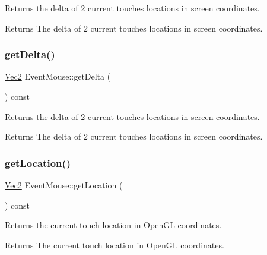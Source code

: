 Returns the delta of 2 current touches locations in screen coordinates.

\begin{DoxyReturn}{Returns}
The delta of 2 current touches locations in screen coordinates. 
\end{DoxyReturn}
\mbox{\label{classEventMouse_abda7f9a6569febd5041d4efd7fca35e6}} 
\subsubsection{\texorpdfstring{get\+Delta()}{getDelta()}\hspace{0.1cm}{\footnotesize\ttfamily [2/2]}}
{\footnotesize\ttfamily \hyperlink{classVec2}{Vec2} Event\+Mouse\+::get\+Delta (\begin{DoxyParamCaption}{ }\end{DoxyParamCaption}) const}

Returns the delta of 2 current touches locations in screen coordinates.

\begin{DoxyReturn}{Returns}
The delta of 2 current touches locations in screen coordinates. 
\end{DoxyReturn}
\mbox{\label{classEventMouse_a3ee0ff253fcf6914a5fdeb9b5c18f2b2}} 
\subsubsection{\texorpdfstring{get\+Location()}{getLocation()}\hspace{0.1cm}{\footnotesize\ttfamily [1/2]}}
{\footnotesize\ttfamily \hyperlink{classVec2}{Vec2} Event\+Mouse\+::get\+Location (\begin{DoxyParamCaption}{ }\end{DoxyParamCaption}) const}

Returns the current touch location in Open\+GL coordinates.

\begin{DoxyReturn}{Returns}
The current touch location in Open\+GL coordinates. 
\end{DoxyReturn}
\mbox{\label{classEventMouse_a3ee0ff253fcf6914a5fdeb9b5c18f2b2}} 
